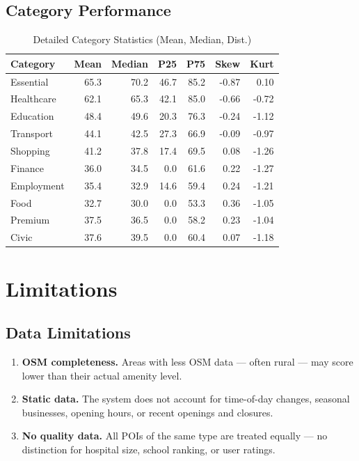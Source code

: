 \documentclass[11pt,a4paper]{article}
\begin{document}
\subsection{Category Performance}

\begin{table}[H]
\centering
\caption{Detailed Category Statistics (Mean, Median, Dist.)}
\begin{tabular}{@{}lrrrrrr@{}}
\toprule
\textbf{Category} & \textbf{Mean} & \textbf{Median} & \textbf{P25} & \textbf{P75} & \textbf{Skew} & \textbf{Kurt} \\ \midrule
Essential   & 65.3 & 70.2 & 46.7 & 85.2 & -0.87 & 0.10 \\
Healthcare  & 62.1 & 65.3 & 42.1 & 85.0 & -0.66 & -0.72 \\
Education   & 48.4 & 49.6 & 20.3 & 76.3 & -0.24 & -1.12 \\
Transport   & 44.1 & 42.5 & 27.3 & 66.9 & -0.09 & -0.97 \\
Shopping    & 41.2 & 37.8 & 17.4 & 69.5 & 0.08 & -1.26 \\
Finance     & 36.0 & 34.5 & 0.0 & 61.6 & 0.22 & -1.27 \\
Employment  & 35.4 & 32.9 & 14.6 & 59.4 & 0.24 & -1.21 \\
Food        & 32.7 & 30.0 & 0.0 & 53.3 & 0.36 & -1.05 \\
Premium     & 37.5 & 36.5 & 0.0 & 58.2 & 0.23 & -1.04 \\
Civic       & 37.6 & 39.5 & 0.0 & 60.4 & 0.07 & -1.18 \\ \bottomrule
\end{tabular}
\end{table}

\section{Limitations}

\subsection{Data Limitations}

\begin{enumerate}
  \item \textbf{OSM completeness.} Areas with less OSM data --- often rural --- may score lower than their actual amenity level.

  \item \textbf{Static data.} The system does not account for time-of-day changes, seasonal businesses, opening hours, or recent openings and closures.

  \item \textbf{No quality data.} All POIs of the same type are treated equally --- no distinction for hospital size, school ranking, or user ratings.
\end{enumerate}
\end{document}
